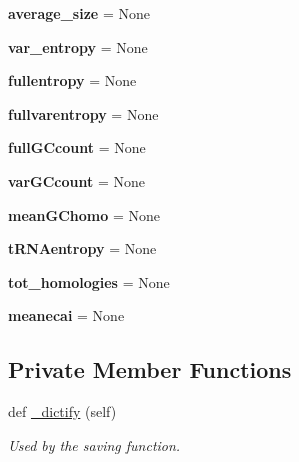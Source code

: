 \begin{DoxyCompactItemize}
\item 
\mbox{\label{class_py_c_u_b_1_1espece_1_1_espece_a2991e13a2c75e2e899f3f8f773d1d9b6}} 
{\bfseries average\+\_\+size} = None
\item 
\mbox{\label{class_py_c_u_b_1_1espece_1_1_espece_ac7ce087a6722a531555c005c6b37ae88}} 
{\bfseries var\+\_\+entropy} = None
\item 
\mbox{\label{class_py_c_u_b_1_1espece_1_1_espece_a27d1e4719b819c4e99e889904fbff5ed}} 
{\bfseries fullentropy} = None
\item 
\mbox{\label{class_py_c_u_b_1_1espece_1_1_espece_a7c21598e68d19819e523bb08af5a815d}} 
{\bfseries fullvarentropy} = None
\item 
\mbox{\label{class_py_c_u_b_1_1espece_1_1_espece_a4c199498e2938fdd8521fb724e9f4e58}} 
{\bfseries full\+G\+Ccount} = None
\item 
\mbox{\label{class_py_c_u_b_1_1espece_1_1_espece_a6f99cfcc3643e72bf48a2479c81b7e03}} 
{\bfseries var\+G\+Ccount} = None
\item 
\mbox{\label{class_py_c_u_b_1_1espece_1_1_espece_a32834ad6a3a42b850438789ae1e7270b}} 
{\bfseries mean\+G\+Chomo} = None
\item 
\mbox{\label{class_py_c_u_b_1_1espece_1_1_espece_a5fdd0450239ab1bbe67a22e51caf15c6}} 
{\bfseries t\+R\+N\+Aentropy} = None
\item 
\mbox{\label{class_py_c_u_b_1_1espece_1_1_espece_a283d26f1b90fe5a4afb4cb4d950b946f}} 
{\bfseries tot\+\_\+homologies} = None
\item 
\mbox{\label{class_py_c_u_b_1_1espece_1_1_espece_af1c5763db7472083035dd6ccb6904a0c}} 
{\bfseries meanecai} = None
\end{DoxyCompactItemize}
\subsection*{Private Member Functions}
\begin{DoxyCompactItemize}
\item 
def \mbox{\hyperlink{class_py_c_u_b_1_1espece_1_1_espece_a4edfabc363a5d4be437afb94f5d03368}{\+\_\+dictify}} (self)
\begin{DoxyCompactList}\small\item\em Used by the saving function. \end{DoxyCompactList}\end{DoxyCompactItemize}


